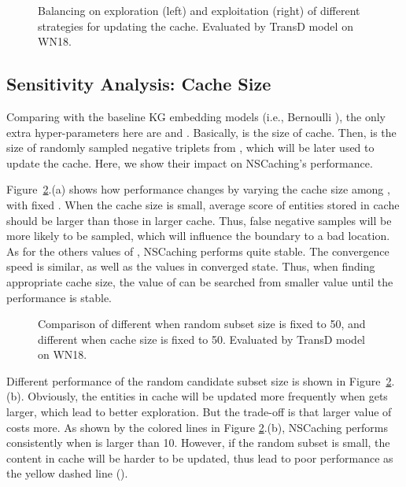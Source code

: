 \documentclass[conference]{IEEEtran}
\begin{document}
 
\begin{figure}[ht]

\caption{Balancing on exploration (left) and exploitation (right) of different strategies for updating the cache. Evaluated by TransD model on WN18.}
\label{fig:update:ee}
\end{figure}
 

\subsection{Sensitivity Analysis: Cache Size}
\label{ssec:exp:size}

Comparing with the baseline KG embedding models (i.e., Bernoulli \cite{wang2014knowledge,lin2015learning}),
the only extra hyper-parameters here are  and .
Basically,
 is the size of cache.
Then,
 is the size of randomly sampled negative triplets from ,
which will be later used to update the cache.
Here,
we show their impact on NSCaching's performance.

Figure~\ref{fig-CS-wn18-transd}.(a) shows how performance changes by varying the cache size  among , with fixed . 
When the cache size is small, average score of entities stored in cache should be larger than those in larger cache. 
Thus, 
false negative samples will be more likely to be sampled, which will influence the boundary to a bad location.
As for the others values of , NSCaching performs quite stable. 
The convergence speed is similar, as well as the values in converged state.
Thus, when finding appropriate cache size, the value of  can be searched from smaller value until the performance is stable.

\begin{figure}[ht]
\centering
{}

\caption{Comparison of different  when random subset size  is fixed to 50, and different  when cache size  is fixed to 50. Evaluated by TransD model on WN18.}
\label{fig-CS-wn18-transd}
\end{figure}




Different performance of the random candidate subset size  is shown in Figure~\ref{fig-CS-wn18-transd}.(b).
Obviously, the entities in cache will be updated more frequently when  gets larger, 
which lead to better exploration. But the trade-off is that larger value of  costs more. 
As shown by the colored lines in Figure \ref{fig-CS-wn18-transd}.(b), NSCaching performs consistently when  is larger than 10.
However, if the random subset is small, the content in cache will be harder to be updated, thus lead to poor performance as the yellow dashed line ().
\end{document}
